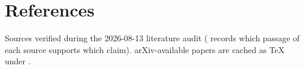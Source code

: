 %

\section*{References}
\label{sec:references}

Sources verified during the 2026-08-13 literature audit
( records which passage of each source supports which
claim). arXiv-available papers are cached as \TeX{} under
.

